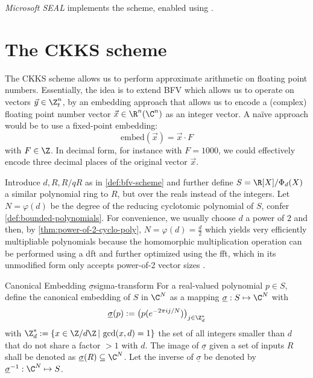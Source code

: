 \textit{Microsoft SEAL} implements the scheme, enabled using .

\section{The CKKS scheme}
\label{sec:ckks}
The CKKS scheme allows us to perform approximate arithmetic on floating point numbers.
Essentially, the idea is to extend BFV which allows us to operate on vectors $\vec{y} \in \Z_t^n$, by an embedding approach that allows us to encode a (complex) floating point number vector $\vec{x} \in \R^n (\C^n)$ as an integer vector. A na\"ive approach would be to use a fixed-point embedding:
\newcommand{\embed}{\mathrm{embed}}
$$\embed(\vec{x}) = \vec{x} \cdot F$$
with $F \in \Z$. In decimal form, for instance with $F = 1000$, we could effectively encode three decimal places of the original vector $\vec{x}$.

Introduce $d, R, R/qR$ as in \autoref{def:bfv-scheme} and further define $S = \R[X] / \Phi_d(X)$ a similar polynomial ring to $R$, but over the reals instead of the integers.
Let $N = \varphi(d)$ be the degree of the reducing cyclotomic polynomial of $S$, confer \autoref{def:bounded-polynomials}.
For convenience, we usually choose $d$ a power of $2$ and then, by \autoref{thm:power-of-2-cyclo-poly}, $N = \varphi(d) = \frac{d}{2}$ which yields very efficiently multipliable polynomials because the homomorphic multiplication operation can be performed using a \gls{dft} and further optimized using the \gls{fft}, which in its unmodified form only accepts power-of-2 vector sizes \parencite{2017-ckks-original}.

\begin{definition}{Canonical Embedding $\underline{\sigma}$}{sigma-transform}
  For a real-valued polynomial $p \in S$, define the canonical embedding of $S$ in $\C^N$ as a mapping $\underline{\sigma}: S \mapsto \C^N$ with $$\underline{\sigma}(p) := \big(p(e^{-2\pi i j / N})\big)_{j \in \Z_d^*}$$
  with $\Z_d^* := \{x \in \Z / d\Z \,|\, \gcd(x, d) = 1\}$ the set of all integers smaller than $d$ that do not share a factor $> 1$ with $d$.
  The image of $\underline{\sigma}$ given a set of inputs $R$ shall be denoted as $\underline{\sigma}(R) \subseteq \C^N$.
  Let the inverse of $\underline{\sigma}$ be denoted by $\underline{\sigma}\inv: \C^N \mapsto S$.
\end{definition}

